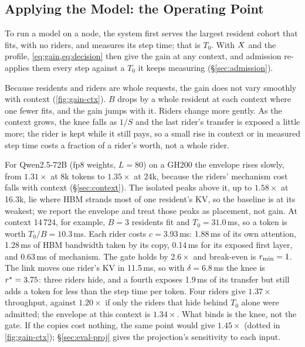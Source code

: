 \subsection{Applying the Model: the Operating Point}\label{sec:opoint}

To run a model on a node, the system first serves the largest resident cohort
that fits, with no riders, and measures its step time; that is $T_0$. With
$X$ and the profile, \cref{eq:gain,eq:decision} then give the gain at any
context, and admission re-applies them every step against a $T_0$ it keeps
measuring (\S\ref{sec:admission}).



Because residents and riders are whole requests, the gain does not vary
smoothly with context (\cref{fig:gain-ctx}). $B$ drops by a whole resident at
each context where one fewer fits, and the gain jumps with it. Riders change
more gently. As the context grows, the knee falls as $1/S$ and the last
rider's transfer is exposed a little more; the rider is kept while it still
pays, so a small rise in context or in measured step time costs a fraction of
a rider's worth, not a whole rider.

For Qwen2.5-72B (fp8 weights, $L{=}80$) on a GH200 the envelope rises slowly,
from $1.31\times$ at 8k tokens to $1.35\times$ at 24k, because the riders'
mechanism cost falls with context (\S\ref{sec:context}). The isolated
peaks above it, up to $1.58\times$ at 16.3k, lie where HBM strands most of one
resident's KV, so the baseline is at its weakest; we report the envelope and
treat those peaks as placement, not gain. At context 14\,724, for example,
$B = 3$ residents fit and $T_0 = 31.0$\,ms, so a token is worth
$T_0/B = 10.3$\,ms. Each rider costs
$c = 3.93$\,ms: 1.88\,ms of its own attention, 1.28\,ms of HBM bandwidth taken
by its copy, 0.14\,ms for its exposed first layer, and 0.63\,ms of mechanism.
The gate holds by $2.6\times$ and break-even is $r_{\min} = 1$. The link moves
one rider's KV in 11.5\,ms, so with $\delta = 6.8$\,ms the knee is
$r^{\star} = 3.75$: three riders hide, and a fourth exposes 1.9\,ms of its
transfer but still adds a token for less than the step time per token. Four
riders give $1.37\times$ throughput, against $1.20\times$ if only the riders
that hide behind $T_0$ alone were admitted; the envelope at this context is
$1.34\times$. What binds is the knee, not the gate. If the copies cost
nothing, the same point would give $1.45\times$ (dotted in
\cref{fig:gain-ctx}); \S\ref{sec:eval-proj} gives the projection's
sensitivity to each input.

